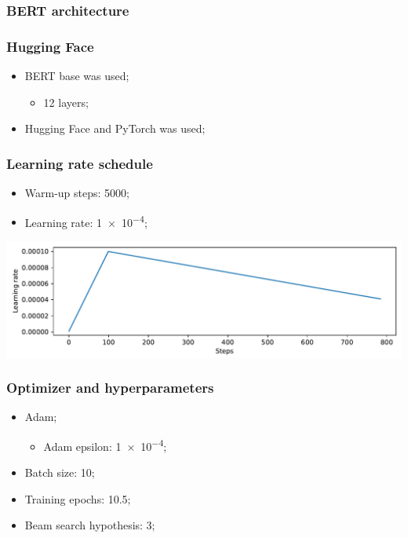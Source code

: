 \documentclass{beamer}
\begin{document}
\begin{frame}
  \frametitle{BERT architecture}

\end{frame}

\begin{frame}
  \frametitle{Hugging Face}

  \begin{itemize}
    \item BERT base was used;
          \begin{itemize}
            \item 12 layers;
          \end{itemize}
    \item Hugging Face and PyTorch was used;
  \end{itemize}
\end{frame}

\begin{frame}
  \frametitle{Learning rate schedule}

  \begin{itemize}
    \item Warm-up steps: \num{5000};
    \item Learning rate: \num{1e-4};
  \end{itemize}

  \bigbreak
  \bigbreak

  \includegraphics[width=\textwidth]{../images/warmup_linear_schedule.pdf}
\end{frame}

\begin{frame}
  \frametitle{Optimizer and hyperparameters}

  \begin{itemize}
    \item Adam;
          \begin{itemize}
            \item Adam epsilon: \num{1e-4};
          \end{itemize}
    \item Batch size: \num{10};
    \item Training epochs: \num{10.5};
    \item Beam search hypothesis: \num{3};
  \end{itemize}
\end{frame}
\end{document}
